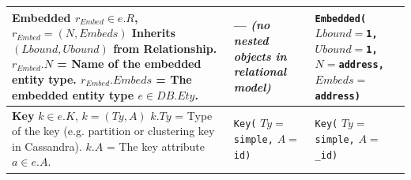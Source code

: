 \begin{longtable}{@{} >{\raggedright}p{5.0cm}
                        >{\raggedright}p{4.0cm}
                        >{\raggedright\arraybackslash}p{4.0cm} @{}}
  \textbf{Embedded}\newline
  $r_{Embed} \in e.R$,\newline
  $r_{Embed} = (N, Embeds)$\newline
  Inherits $(Lbound, Ubound)$ from\newline
  \quad Relationship.\newline
  $r_{Embed}.N$ = Name of the\newline
  \quad embedded entity type.\newline
  $r_{Embed}.Embeds$ = The embedded\newline
  \quad entity type $e \in DB.Ety$.
  &
  --- \textit{(no nested objects\newline
  in relational model)}
  &
  \texttt{Embedded(}\newline
  \quad $Lbound{=}$\texttt{1,}\newline
  \quad $Ubound{=}$\texttt{1,}\newline
  \quad $N{=}$\texttt{address,}\newline
  \quad $Embeds{=}$\texttt{address)}
  \\
  \midrule

  \textbf{Key}\newline
  $k \in e.K$, $k = (Ty, A)$\newline
  $k.Ty$ = Type of the key (e.g.\newline
  \quad partition or clustering key\newline
  \quad in Cassandra).\newline
  $k.A$ = The key attribute $a \in e.A$.
  &
  \texttt{Key(}\newline
  \quad $Ty{=}$\texttt{simple,}\newline
  \quad $A{=}$\texttt{id)}
  &
  \texttt{Key(}\newline
  \quad $Ty{=}$\texttt{simple,}\newline
  \quad $A{=}$\texttt{\_id)}
  \\
  \midrule


\end{longtable}

